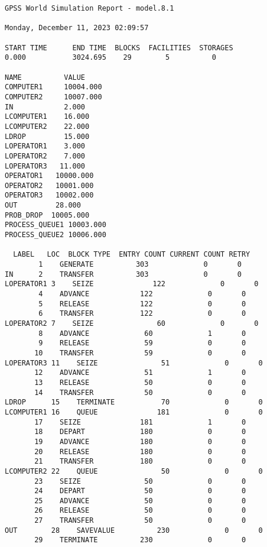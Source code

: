 \begin{lstlisting}[label=data20,caption=Результат работы программы для стандартных данных]
 GPSS World Simulation Report - model.8.1

Monday, December 11, 2023 02:09:57  

START TIME      END TIME  BLOCKS  FACILITIES  STORAGES
0.000           3024.695    29        5          0

NAME          VALUE  
COMPUTER1     10004.000
COMPUTER2     10007.000
IN            2.000
LCOMPUTER1    16.000
LCOMPUTER2    22.000
LDROP         15.000
LOPERATOR1    3.000
LOPERATOR2    7.000
LOPERATOR3   11.000
OPERATOR1   10000.000
OPERATOR2   10001.000
OPERATOR3   10002.000
OUT         28.000
PROB_DROP  10005.000
PROCESS_QUEUE1 10003.000
PROCESS_QUEUE2 10006.000

  LABEL   LOC  BLOCK TYPE  ENTRY COUNT CURRENT COUNT RETRY
        1    GENERATE          303             0       0
IN      2    TRANSFER          303             0       0
LOPERATOR1 3    SEIZE              122             0       0
        4    ADVANCE            122             0       0
        5    RELEASE            122             0       0
        6    TRANSFER           122             0       0
LOPERATOR2 7    SEIZE               60             0       0
        8    ADVANCE             60             1       0
        9    RELEASE             59             0       0
       10    TRANSFER            59             0       0
LOPERATOR3 11    SEIZE               51             0       0
       12    ADVANCE             51             1       0
       13    RELEASE             50             0       0
       14    TRANSFER            50             0       0
LDROP      15    TERMINATE           70             0       0
LCOMPUTER1 16    QUEUE              181             0       0
       17    SEIZE              181             1       0
       18    DEPART             180             0       0
       19    ADVANCE            180             0       0
       20    RELEASE            180             0       0
       21    TRANSFER           180             0       0
LCOMPUTER2 22    QUEUE               50             0       0
       23    SEIZE               50             0       0
       24    DEPART              50             0       0
       25    ADVANCE             50             0       0
       26    RELEASE             50             0       0
       27    TRANSFER            50             0       0
OUT        28    SAVEVALUE          230             0       0
       29    TERMINATE          230             0       0


\end{lstlisting}
